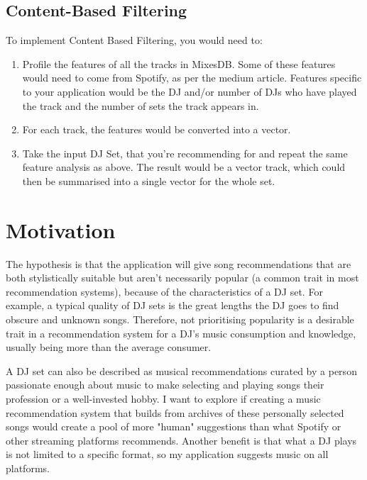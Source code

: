 \documentclass[]{article}
\begin{document}
  \subsection{Content-Based Filtering}
  To implement Content Based Filtering, you would need to:
 \begin{enumerate}
 	
 	\item  Profile the features of all the tracks in MixesDB. Some of these features would need to come from Spotify, as per the medium article. Features specific to your application would be the DJ and/or number of DJs who have played the track and the number of sets the track appears in.
 	
 	\item For each track, the features would be converted into a vector.
 	
 	\item Take the input DJ Set, that you're recommending for and repeat the same feature analysis as above. The result would be a vector track, which could then be summarised into a single vector for the whole set.
 	
 \end{enumerate}

\section{Motivation}

	The hypothesis is that the application will give song recommendations that are both stylistically suitable but aren't necessarily popular (a common trait in most recommendation systems), because of the characteristics of a DJ set. For example, a typical quality of DJ sets is the great lengths the DJ goes to find obscure and unknown songs. Therefore, not prioritising popularity is a desirable trait in a recommendation system for a DJ's music consumption and knowledge, usually being more than the average consumer. 
	
	\begin{flushleft}
		
		A DJ set can also be described as musical recommendations curated by a person passionate enough about music to make selecting and playing songs their profession or a well-invested hobby. I want to explore if creating a music recommendation system that builds from archives of these personally selected songs would create a pool of more "human" suggestions than what Spotify or other streaming platforms recommends. Another benefit is that what a DJ plays is not limited to a specific format, so my application suggests music on all platforms.
		
	\end{flushleft}
	
\end{document}
